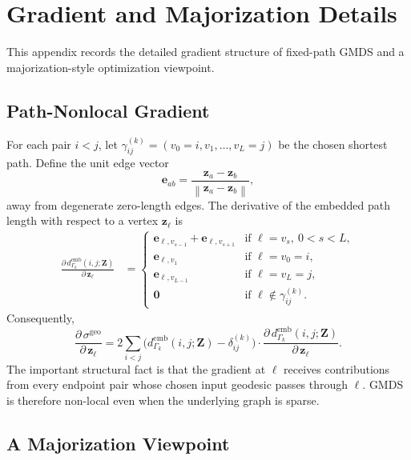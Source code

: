 \documentclass[twoside,11pt]{article}
\newcommand{\bz}{\mathbf{z}}
\newcommand{\bZ}{\mathbf{Z}}
\newcommand{\norm}[1]{\left\|#1\right\|}
\newcommand{\demb}{d^{\mathrm{emb}}}
\begin{document}
\section{Gradient and Majorization Details}
\label{app:gradient_majorization}

This appendix records the detailed gradient structure of fixed-path GMDS and a
majorization-style optimization viewpoint.

\subsection{Path-Nonlocal Gradient}

For each pair $i<j$, let
$\gamma_{ij}^{(k)}=(v_0=i,v_1,\ldots,v_L=j)$ be the chosen shortest path.
Define the unit edge vector
\begin{equation}
  \mathbf{e}_{ab} = \frac{\bz_a - \bz_b}{\norm{\bz_a - \bz_b}},
  \label{eq:unit_edge}
\end{equation}
away from degenerate zero-length edges.  The derivative of the embedded path
length with respect to a vertex $\bz_\ell$ is
\begin{align}
  \frac{\partial\, \demb_{\Gamma_k}(i,j;\bZ)}{\partial\, \bz_\ell}
  &= \begin{cases}
       \mathbf{e}_{\ell, v_{s-1}} + \mathbf{e}_{\ell, v_{s+1}}
         & \text{if } \ell = v_s,\ 0 < s < L, \\
       \mathbf{e}_{\ell, v_1}
         & \text{if } \ell = v_0 = i, \\
       \mathbf{e}_{\ell, v_{L-1}}
         & \text{if } \ell = v_L = j, \\
       \bm{0}
         & \text{if } \ell \notin \gamma_{ij}^{(k)}.
     \end{cases}
  \label{eq:geo_distance_gradient}
\end{align}
Consequently,
\begin{equation}
  \frac{\partial\, \sigma^{\mathrm{geo}}}{\partial\, \bz_\ell}
  = 2 \sum_{i < j}
    \bigl(\demb_{\Gamma_k}(i,j;\bZ) - \delta^{(k)}_{ij}\bigr)
    \cdot \frac{\partial\, \demb_{\Gamma_k}(i,j;\bZ)}{\partial\, \bz_\ell}.
  \label{eq:raw_gradient}
\end{equation}
The important structural fact is that the gradient at $\ell$ receives
contributions from every endpoint pair whose chosen input geodesic passes
through $\ell$.  GMDS is therefore non-local even when the underlying graph is
sparse.

\subsection{A Majorization Viewpoint}
\end{document}
